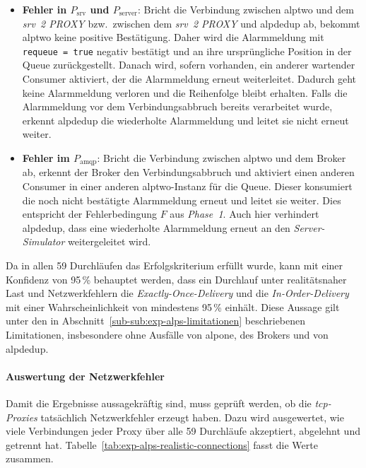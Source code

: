 \begin{itemize}
    \item \textbf{Fehler in $P_{\text{srv}}$ und $P_{\text{server}}$}: Bricht die Verbindung zwischen \gls{alptwo} und dem \textit{\gls{srv}~2 PROXY} bzw.~zwischen dem \textit{\gls{srv}~2 PROXY} und \gls{alpdedup} ab, bekommt \gls{alptwo} keine positive Bestätigung. Daher wird die Alarmmeldung mit \texttt{requeue = true} negativ bestätigt und an ihre ursprüngliche Position in der Queue zurückgestellt. Danach wird, sofern vorhanden, ein anderer wartender Consumer aktiviert, der die Alarmmeldung erneut weiterleitet. Dadurch geht keine Alarmmeldung verloren und die Reihenfolge bleibt erhalten. Falls die Alarmmeldung vor dem Verbindungsabbruch bereits verarbeitet wurde, erkennt \gls{alpdedup} die wiederholte Alarmmeldung und leitet sie nicht erneut weiter.

    \item \textbf{Fehler im $P_{\text{amqp}}$}: Bricht die Verbindung zwischen \gls{alptwo} und dem Broker ab, erkennt der Broker den Verbindungsabbruch und aktiviert einen anderen Consumer in einer anderen \gls{alptwo}-Instanz für die Queue. Dieser konsumiert die noch nicht bestätigte Alarmmeldung erneut und leitet sie weiter. Dies entspricht der Fehlerbedingung $F$ aus \textit{Phase~1}. Auch hier verhindert \gls{alpdedup}, dass eine wiederholte Alarmmeldung erneut an den \textit{Server-Simulator} weitergeleitet wird.
\end{itemize}

Da in allen 59 Durchläufen das Erfolgskriterium erfüllt wurde, kann mit einer Konfidenz von 95\,\% behauptet werden, dass ein Durchlauf unter realitätsnaher Last und Netzwerkfehlern die \textit{Exactly-Once-Delivery} und die \textit{In-Order-Delivery} mit einer Wahrscheinlichkeit von mindestens 95\,\% einhält. Diese Aussage gilt unter den in Abschnitt~\ref{sub-sub:exp-alps-limitationen} beschriebenen Limitationen, insbesondere ohne Ausfälle von \gls{alpone}, des Brokers und von \gls{alpdedup}.

\paragraph{Auswertung der Netzwerkfehler}

Damit die Ergebnisse aussagekräftig sind, muss geprüft werden, ob die \textit{\gls{tcp}-Proxies} tatsächlich Netzwerkfehler erzeugt haben. Dazu wird ausgewertet, wie viele Verbindungen jeder Proxy über alle 59 Durchläufe akzeptiert, abgelehnt und getrennt hat. Tabelle~\ref{tab:exp-alps-realistic-connections} fasst die Werte zusammen.

